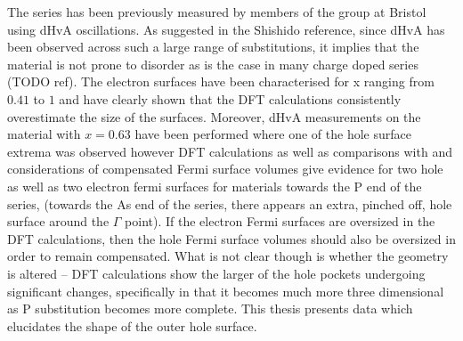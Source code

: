The \BaFePAs series has been previously measured by members of the group at Bristol using dHvA oscillations\cite{Shishido2010}. As suggested in the Shishido reference, since dHvA has been observed across such a large range of substitutions, it implies that the material is not prone to disorder as is the case in many charge doped series (TODO ref). The electron surfaces have been characterised for x ranging from $0.41$ to $1$ and have clearly shown that the DFT calculations consistently overestimate the size of the surfaces. Moreover, dHvA measurements on the material with $x=0.63$ have been performed where one of the hole surface extrema was observed\cite{Analytis2010c} however DFT calculations as well as comparisons with \SrFeP\cite{Analytis2009} and considerations of compensated Fermi surface volumes give evidence for two hole as well as two electron fermi surfaces for materials towards the P end of the series, (towards the As end of the series, there appears an extra, pinched off, hole surface around the $\Gamma$ point). If the electron Fermi surfaces are oversized in the DFT calculations, then the hole Fermi surface volumes should also be oversized in order to remain compensated. What is not clear though is whether the geometry is altered -- DFT calculations show the larger of the hole pockets undergoing significant changes, specifically in that it becomes much more three dimensional as P substitution becomes more complete. This thesis presents data which elucidates the shape of the outer hole surface.

